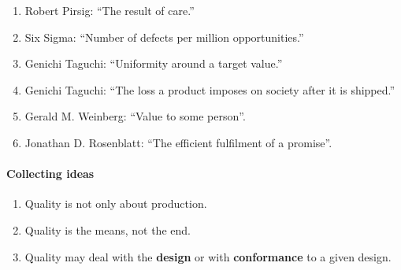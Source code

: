 \begin{enumerate}
\item Robert Pirsig: ``The result of care.''
\item Six Sigma: ``Number of defects per million opportunities.''
\item Genichi Taguchi:
``Uniformity around a target value.''
\item Genichi Taguchi:
``The loss a product imposes on society after it is shipped.''
\item Gerald M. Weinberg: ``Value to some person''.
\item Jonathan D. Rosenblatt: ``The efficient fulfilment of a promise''.
\end{enumerate}



\begin{tcolorbox}[breakable]
\paragraph{Collecting ideas}
\begin{enumerate}
\item Quality is not only about production. 
\item Quality is the means, not the end.
\item Quality may deal with the \textbf{design} or with \textbf{conformance} to a given design. 
\end{enumerate}
\end{tcolorbox}


